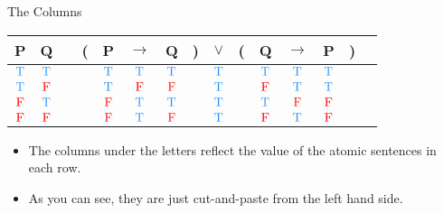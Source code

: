 \documentclass[
  ignorenonframetext,
]{beamer}
\providecommand{\tightlist}{%
  \setlength{\itemsep}{0pt}\setlength{\parskip}{0pt}}
\renewcommand{\,}{\text{, }}
\def\True{\textcolor{dodgerblue}{\text{T}}}
\def\False{\textcolor{red}{\text{F}}}
\begin{document}
\begin{frame}{The Columns}
\protect\hypertarget{the-columns}{}

\begin{center}
\begin{tabular}{@{ }c@{ }@{ }c | c@{ }@{}c@{}@{ }c@{ }@{ }c@{ }@{ }c@{ }@{}c@{}@{ }c@{ }@{}c@{}@{ }c@{ }@{ }c@{ }@{ }c@{ }@{}c@{}@{ }c}
P & Q &  & ( & P & $\rightarrow$ & Q & ) & $\lor$ & ( & Q & $\rightarrow$ & P & ) & \\
\hline 
$\True$ & $\True$ &  &  & $\True$ & $\True$ & $\True$ &  & \textcolor{red}{$\True$} &  & $\True$ & $\True$ & $\True$ &  & \\
$\True$ & $\False$ &  &  & $\True$ & $\False$ & $\False$ &  & \textcolor{red}{$\True$} &  & $\False$ & $\True$ & $\True$ &  & \\
$\False$ & $\True$ &  &  & $\False$ & $\True$ & $\True$ &  & \textcolor{red}{$\True$} &  & $\True$ & $\False$ & $\False$ &  & \\
$\False$ & $\False$ &  &  & $\False$ & $\True$ & $\False$ &  & \textcolor{red}{$\True$} &  & $\False$ & $\True$ & $\False$ &  & \\
\end{tabular}
\bigskip
\end{center}

\begin{itemize}
\tightlist
\item
  The columns under the letters reflect the value of the atomic
  sentences in each row.
\item
  As you can see, they are just cut-and-paste from the left hand side.
\end{itemize}

\end{frame}
\end{document}
